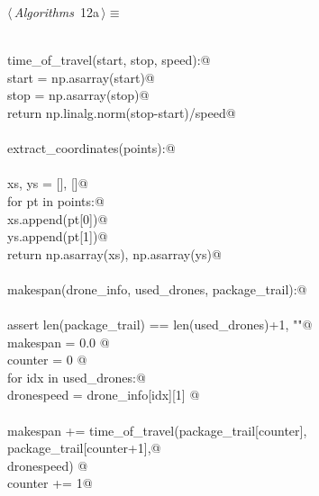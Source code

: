 \documentclass[10pt, english, oneside]{report}
\begin{document}
\begin{flushleft} \small
\begin{minipage}{\linewidth}\label{scrap11}\raggedright\small
{} $\langle\,${\itshape Algorithms}\nobreak\ {\footnotesize {12a}}$\,\rangle\equiv$
\vspace{-1ex}
\begin{list}{}{} \item
\mbox{}\verb@@\\
\mbox{}\verb@def time_of_travel(start, stop, speed):@\\
\mbox{}\verb@     start = np.asarray(start)@\\
\mbox{}\verb@     stop  = np.asarray(stop)@\\
\mbox{}\verb@     return np.linalg.norm(stop-start)/speed@\\
\mbox{}\verb@@\\
\mbox{}\verb@def extract_coordinates(points):@\\
\mbox{}\verb@@\\
\mbox{}\verb@    xs, ys = [], []@\\
\mbox{}\verb@    for pt in points:@\\
\mbox{}\verb@        xs.append(pt[0])@\\
\mbox{}\verb@        ys.append(pt[1])@\\
\mbox{}\verb@    return np.asarray(xs), np.asarray(ys)@\\
\mbox{}\verb@@\\
\mbox{}\verb@def makespan(drone_info, used_drones, package_trail):@\\
\mbox{}\verb@@\\
\mbox{}\verb@    assert len(package_trail) == len(used_drones)+1, ""@\\
\mbox{}\verb@    makespan = 0.0   @\\
\mbox{}\verb@    counter  = 0    @\\
\mbox{}\verb@    for idx in used_drones:@\\
\mbox{}\verb@         dronespeed    = drone_info[idx][1]          @\\
\mbox{}\verb@@\\
\mbox{}\verb@         makespan += time_of_travel(package_trail[counter],\@\\
\mbox{}\verb@                                    package_trail[counter+1],@\\
\mbox{}\verb@                                    dronespeed) @\\
\mbox{}\verb@         counter += 1@\\

\end{list}
\end{minipage}
\end{flushleft}
\end{document}
